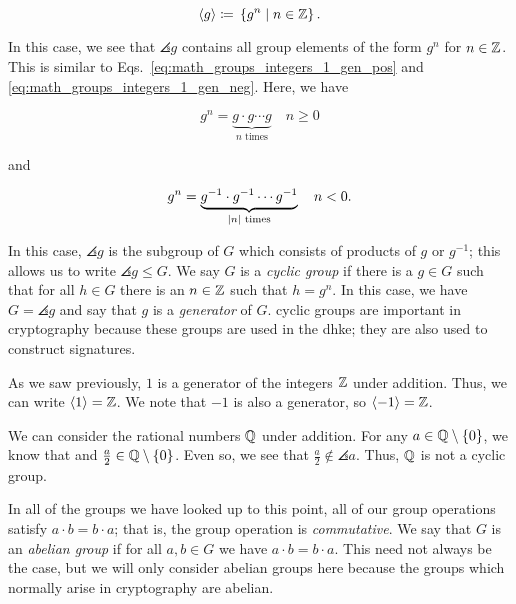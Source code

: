 \begin{equation}
    \left\langle g \right\rangle \coloneqq{} \left\{ g^{n} \mid n\in\mathbb{Z} \right\}.
\end{equation}

\noindent
In this case, we see that $\angles{g}$ contains all group elements
of the form $g^{n}$ for $n\in\mathbb{Z}$.
This is similar to Eqs.~\eqref{eq:math_groups_integers_1_gen_pos}
and \eqref{eq:math_groups_integers_1_gen_neg}.
Here, we have

\begin{equation}
    g^{n} = \underbrace{g \cdot g \cdots g}_{\text{$n$ times}} \quad n\ge 0
\end{equation}

\noindent
and

\begin{equation}
    g^{n} = \underbrace{g^{-1} \cdot g^{-1} \cdots g^{-1}}_{\text{$\left| n \right|$
        times}} \quad n < 0.
\end{equation}

\noindent
In this case, $\angles{g}$ is the \gls{subgroup} of $G$ which consists
of products of $g$ or $g^{-1}$;
this allows us to write $\angles{g}\le G$.
We say $G$ is a \emph{\gls{cyclic group}} if there is a $g\in G$ such that
for all $h\in G$ there is an $n\in\mathbb{Z}$ such that $h = g^{n}$.
In this case, we have $G = \angles{g}$ and 
say that $g$ is a \emph{generator} of $G$.
\Glspl{cyclic group} are important in cryptography because
these \glspl{group} are used in the \gls{dhke};
they are also used to construct \glspl{signature}.

\begin{example}
As we saw previously, $1$ is a generator of the integers $\mathbb{Z}$ under addition.
Thus, we can write $\left\langle 1 \right\rangle = \mathbb{Z}$.
We note that $-1$ is also a generator, so $\left\langle -1 \right\rangle = \mathbb{Z}$.
\end{example}

\begin{example}
We can consider the rational numbers $\mathbb{Q}$ under addition.
For any $a \in \mathbb{Q}\setminus\left\{ 0 \right\}$, we know that
and $\frac{a}{2}\in\mathbb{Q}\setminus\left\{ 0 \right\}$.
Even so, we see that $\frac{a}{2} \not\in \angles{a}$.
Thus, $\mathbb{Q}$ is not a \gls{cyclic group}.
\end{example}

In all of the groups we have looked up to this point,
all of our group operations satisfy $a\cdot b = b\cdot a$;
that is, the group operation is \emph{\gls{commutative}}.
We say that $G$ is an \emph{\gls{abelian group}} if for all $a,b\in G$
we have $a\cdot b = b\cdot a$.
This need not always be the case, but we will only consider
\glspl{abelian group} here because the \glspl{group} which normally arise
in cryptography are abelian.


